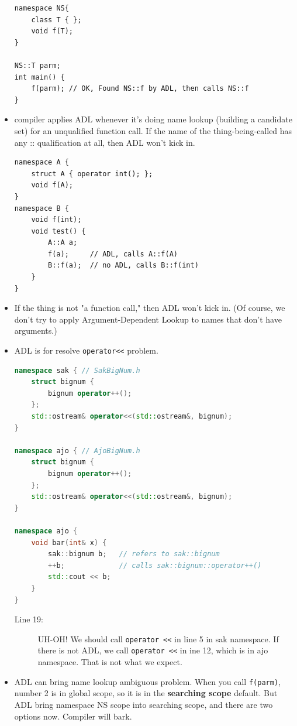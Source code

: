 \documentclass[a4paper,11pt,twoside]{book}
\begin{document}
\begin{itemize}
\begin{lstlisting}[numbers=none]
namespace NS{
	class T { };
	void f(T);
}
	
NS::T parm;
int main() {
	f(parm); // OK, Found NS::f by ADL, then calls NS::f
}
\end{lstlisting}

\item compiler applies ADL whenever it's doing name lookup (building a candidate set) for an unqualified function call. If the name of the thing-being-called has any :: qualification at all, then ADL won't kick in.

\begin{lstlisting}[numbers=none]
namespace A {
	struct A { operator int(); };
	void f(A);
}
namespace B {
	void f(int);
	void test() {
		A::A a;
		f(a);     // ADL, calls A::f(A)
		B::f(a);  // no ADL, calls B::f(int)
	}	
}
\end{lstlisting}

\item  If the thing is not "a function call," then ADL won't kick in. (Of course, we don't try to apply Argument-Dependent Lookup to names that don't have arguments.) 
	
\item ADL is for resolve \texttt{operator<<} problem.
\begin{lstlisting}[frame=single, language=c++]
namespace sak { // SakBigNum.h
	struct bignum {
		bignum operator++();
	};
	std::ostream& operator<<(std::ostream&, bignum); 
}

namespace ajo { // AjoBigNum.h
	struct bignum {
		bignum operator++();
	};
	std::ostream& operator<<(std::ostream&, bignum);
}
	
namespace ajo {
	void bar(int& x) {
		sak::bignum b;   // refers to sak::bignum
		++b;             // calls sak::bignum::operator++()
		std::cout << b;  
	}
}
\end{lstlisting}
\begin{description}
	\item[Line 19:] UH-OH! We should call \texttt{operator <<} in line 5 in sak namespace. If there is not ADL, we call \texttt{operator <<} in ine 12, which is in ajo namespace. That is not what we expect. 
\end{description}
	
	\item ADL can bring name lookup ambiguous problem.  When you call \texttt{f(parm)}, number 2 is in global scope, so it is in the \textbf{searching scope} default. But ADL bring namespace NS scope into searching scope, and there are two options now. Compiler will bark.
	

\end{itemize}
\end{document}
